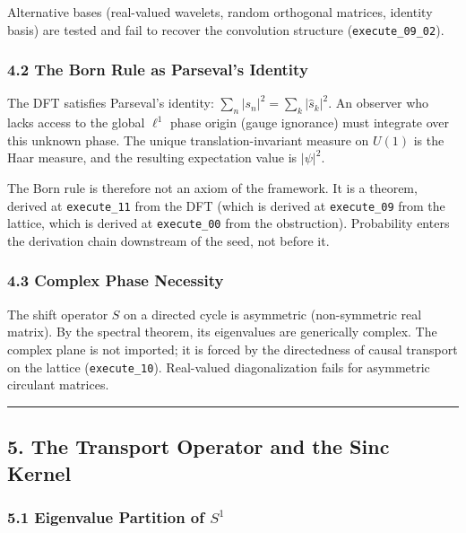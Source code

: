 \documentclass[
]{article}
\begin{document}
Alternative bases (real-valued wavelets, random orthogonal matrices,
identity basis) are tested and fail to recover the convolution structure
(\texttt{execute\_09\_02}).

\hypertarget{the-born-rule-as-parsevals-identity}{%
\subsubsection{4.2 The Born Rule as Parseval's
Identity}\label{the-born-rule-as-parsevals-identity}}

The DFT satisfies Parseval's identity:
\(\sum_n |s_n|^2 = \sum_k |\hat{s}_k|^2\). An observer who lacks access
to the global \(\ell^1\) phase origin (gauge ignorance) must integrate
over this unknown phase. The unique translation-invariant measure on
\(U(1)\) is the Haar measure, and the resulting expectation value is
\(|\psi|^2\).

The Born rule is therefore not an axiom of the framework. It is a
theorem, derived at \texttt{execute\_11} from the DFT (which is derived
at \texttt{execute\_09} from the lattice, which is derived at
\texttt{execute\_00} from the obstruction). Probability enters the
derivation chain downstream of the seed, not before it.

\hypertarget{complex-phase-necessity}{%
\subsubsection{4.3 Complex Phase
Necessity}\label{complex-phase-necessity}}

The shift operator \(S\) on a directed cycle is asymmetric
(non-symmetric real matrix). By the spectral theorem, its eigenvalues
are generically complex. The complex plane is not imported; it is forced
by the directedness of causal transport on the lattice
(\texttt{execute\_10}). Real-valued diagonalization fails for asymmetric
circulant matrices.

\begin{center}\rule{0.5\linewidth}{0.5pt}\end{center}

\hypertarget{the-transport-operator-and-the-sinc-kernel}{%
\subsection{5. The Transport Operator and the Sinc
Kernel}\label{the-transport-operator-and-the-sinc-kernel}}

\hypertarget{eigenvalue-partition-of-s1}{%
\subsubsection{\texorpdfstring{5.1 Eigenvalue Partition of
\(S^1\)}{5.1 Eigenvalue Partition of S\^{}1}}\label{eigenvalue-partition-of-s1}}
\end{document}
